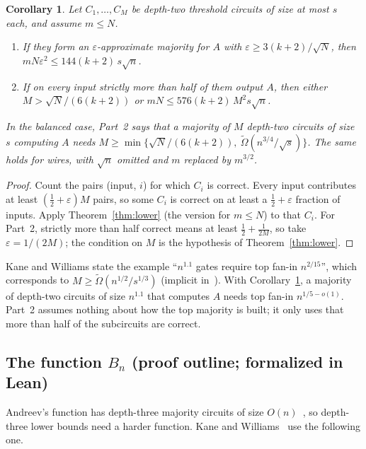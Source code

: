 \documentclass[11pt,letterpaper]{article}
\newtheorem{corollary}[theorem]{Corollary}
\theoremstyle{remark}
\newcommand{\subsect}[1]{\subsection*{\texorpdfstring{\color{ink}#1}{#1}}}
\begin{document}
\begin{corollary}\label{cor:fanin}
Let $C_1,\dots,C_M$ be depth-two threshold circuits of size at most $s$
each, and assume $m\le N$.
\begin{enumerate}
\item If they form an $\varepsilon$-approximate majority for $A$ with
      $\varepsilon\ge3(k+2)/\sqrt N$, then
      $mN\varepsilon^2\le144(k+2)\,s\sqrt n$.
\item If on every input strictly more than half of them output $A$, then
      either $M>\sqrt N/(6(k+2))$ or $mN\le576(k+2)\,M^2s\sqrt n$.
\end{enumerate}
In the balanced case, Part~2 says that a majority of $M$ depth-two circuits
of size $s$ computing $A$ needs
$M\ge\min\bigl\{\sqrt N/(6(k+2)),\ \tilde\Omega(n^{3/4}/\sqrt s)\bigr\}$.
The same holds for wires, with $\sqrt n$ omitted and $m$ replaced by
$m^{3/2}$.
\end{corollary}
\begin{proof}
Count the pairs (input, $i$) for which $C_i$ is correct. Every input
contributes at least $(\tfrac12+\varepsilon)M$ pairs, so some $C_i$ is
correct on at least a $\tfrac12+\varepsilon$ fraction of inputs. Apply
Theorem~\ref{thm:lower} (the version for $m\le N$) to that $C_i$. For
Part~2, strictly more than half correct means at least
$\tfrac12+\tfrac1{2M}$, so take $\varepsilon=1/(2M)$; the condition on $M$
is the hypothesis of Theorem~\ref{thm:lower}.
\end{proof}
Kane and Williams state the example ``$n^{1.1}$ gates require top fan-in
$n^{2/15}$'', which corresponds to $M\ge\tilde\Omega(n^{1/2}/s^{1/3})$
(implicit in~\cite[Cor.~1.1]{KW}). With Corollary~\ref{cor:fanin}, a majority
of depth-two circuits of size $n^{1.1}$ that computes $A$ needs top fan-in
$n^{1/5-o(1)}$. Part~2 assumes nothing about how the top majority is built;
it only uses that more than half of the subcircuits are correct.

\subsect{The function \texorpdfstring{$B_n$}{B\_n} (proof outline; formalized in Lean)}

Andreev's function has depth-three majority circuits of size
$O(n)$~\cite[Thm.~1.2]{KW}, so depth-three lower bounds need a harder
function. Kane and Williams~\cite[Section~6]{KW} use the following one.
\end{document}
